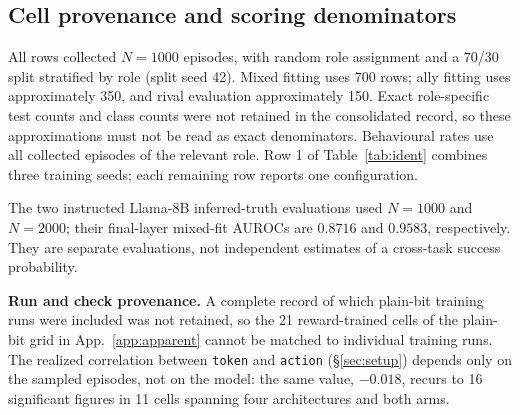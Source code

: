 \subsection{Cell provenance and scoring denominators}
\label{app:counts}
All rows collected $N=1000$ episodes, with random role assignment and a 70/30 split stratified by role (split seed 42). Mixed fitting uses 700 rows; ally fitting uses approximately 350, and rival evaluation approximately 150. Exact role-specific test counts and class counts were not retained in the consolidated record, so these approximations must not be read as exact denominators. Behavioural rates use all collected episodes of the relevant role.
 Row 1 of Table~\ref{tab:ident} combines three training seeds; each remaining row reports one configuration.\par
The two instructed Llama-8B inferred-truth evaluations used $N=1000$ and $N=2000$; their final-layer mixed-fit AUROCs are $0.8716$ and $0.9583$, respectively. They are separate evaluations, not independent estimates of a cross-task success probability.

\textbf{Run and check provenance.} A complete record of which plain-bit training runs were included was not retained, so the 21 reward-trained cells of the plain-bit grid in App.~\ref{app:apparent} cannot be matched to individual training runs. The realized correlation between \texttt{token} and \texttt{action} (\S\ref{sec:setup}) depends only on the sampled episodes, not on the model: the same value, $-0.018$, recurs to 16 significant figures in 11 cells spanning four architectures and both arms.

